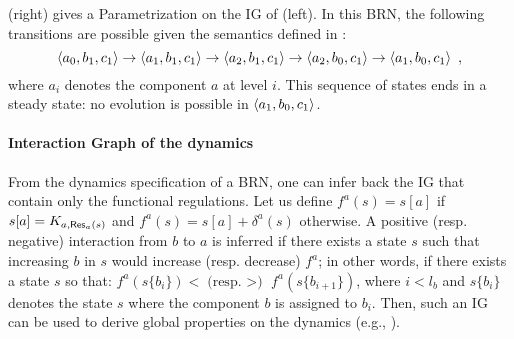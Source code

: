\begin{example}
(right) gives a Parametrization on the IG of (left).
In this BRN, the following transitions are possible given the semantics defined in :
$$\mbox{$\langle a_0, b_1, c_1 \rangle$} \rightarrow \mbox{$\langle a_1, b_1, c_1 \rangle$} \rightarrow \mbox{$\langle a_2, b_1, c_1 \rangle$} \rightarrow
\mbox{$\langle a_2, b_0, c_1 \rangle$} \rightarrow \mbox{$\langle a_1, b_0, c_1 \rangle$} \enspace,$$
where $a_i$ denotes the component $a$ at level $i$.
This sequence of states ends in a steady state: no evolution is possible in $\mbox{$\langle a_1, b_0, c_1 \rangle$}$.
\end{example}

\begin{remark}
\label{rem:K-equiv}


\end{remark}


\paragraph{Interaction Graph of the dynamics}
From the dynamics specification of a BRN, one can infer back the IG that contain only the functional
regulations.
Let us define
$f^a(s) = s[a]$ if $s[a] = K_{a, \mathsf{Res}_{a}(s)}$
and
$f^a(s) = s[a]+\delta^a(s)$ otherwise.
A positive (resp. negative) interaction from $b$ to $a$ is inferred if there exists a state $s$ such
that increasing $b$ in $s$ would increase (resp. decrease) $f^a$; in other words, if
there exists a state $s$ so that:
$f^a(s\{b_i\}) < \text{(resp. $>$) } f^a(s\{b_{i+1}\})$, 
where $i < l_b$ and $s\{b_i\}$ denotes the state $s$ where the component $b$ is assigned to $b_i$.
Then, such an IG can be used to derive global properties on the dynamics
(e.g., \cite{Richard2010378,PR11-SASB}).

